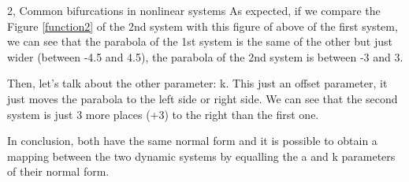 \documentclass[10pt,a4paper]{article}
\begin{document}
\begin{task}{2, Common bifurcations in nonlinear systems}
As expected, if we compare the Figure \ref{function2} of the 2nd system with this figure of above of the first system, we can see that the parabola of the 1st system is the same of the other but just wider (between -4.5 and 4.5), the parabola of the 2nd system is between -3 and 3.

Then, let's talk about the other parameter: k. This just an offset parameter, it just moves the parabola to the left side or right side. We can see that the second system is just 3 more places (+3) to the right than the first one.

In conclusion, both have the same normal form and it is possible to obtain a mapping between the two dynamic systems by equalling the a and k parameters of their normal form.

\end{task}

\newpage
\end{document}
